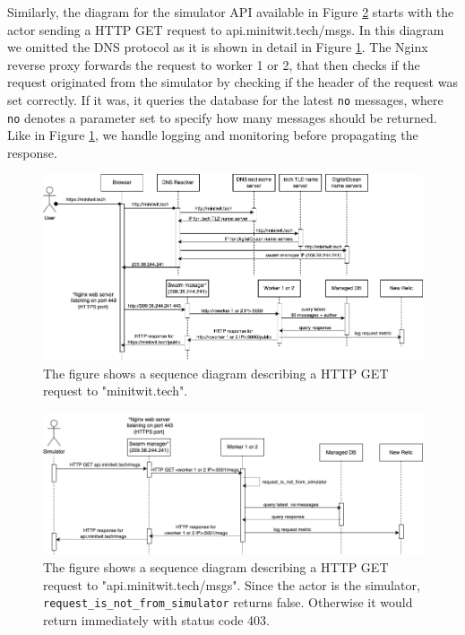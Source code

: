 \documentclass{article}
\begin{document}
Similarly, the diagram for the simulator API available in Figure \ref{fig:sequence_api} starts with the actor sending a HTTP GET request to api.minitwit.tech/msgs. In this diagram we omitted the DNS protocol as it is shown in detail in Figure \ref{fig:sequence}. The Nginx reverse proxy forwards the request to worker 1 or 2, that then checks if the request originated from the simulator by checking if the header of the request was set correctly. If it was, it queries the database for the latest \texttt{no} messages, where \texttt{no} denotes a parameter set to specify how many messages should be returned. Like in Figure \ref{fig:sequence}, we handle logging and monitoring before propagating the response.

\begin{figure}[H]
    \centering
    \includegraphics[width=\textwidth]{images/devops-sequence.png}
    \caption{The figure shows a sequence diagram describing a HTTP GET request to "minitwit.tech". }
    \label{fig:sequence}
\end{figure}


\begin{figure}[H]
    \centering
    \includegraphics[width=\textwidth]{images/api-sequence.png}
    \caption{The figure shows a sequence diagram describing a HTTP GET request to "api.minitwit.tech/msgs". Since the actor is the simulator, \texttt{request\_is\_not\_from\_simulator} returns false. Otherwise it would return immediately with status code 403.}
    \label{fig:sequence_api}
\end{figure}
\end{document}
